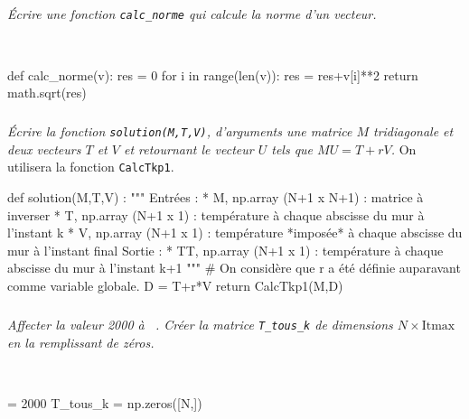 \documentclass[10pt,fleqn]{article} %
\begin{document}
\begin{multicols}{2}
\fi

\subparagraph{}
\textit{Écrire une fonction \texttt{calc\_norme} qui calcule la norme d'un vecteur. }
\ifprof
\begin{corrige}
 ~\\
\begin{python}
def calc_norme(v):
    res = 0
    for i in range(len(v)):
        res = res+v[i]**2
    return math.sqrt(res)        
\end{python}
\end{corrige}
\else
\fi

\subparagraph{\label{q_solve}}
\textit{Écrire la fonction \texttt{solution(M,T,V)}, d'arguments une matrice $M$
 tridiagonale et deux vecteurs $T$ et $V$ et retournant le vecteur $U$ tels que $MU=T+rV$.}
 On utilisera la fonction \texttt{CalcTkp1}.
\ifprof   
\begin{corrige}
\begin{python}
def solution(M,T,V) :
    """
    Entrées : 
        * M, np.array (N+1 x N+1) : matrice à inverser
        * T, np.array (N+1 x 1) : température à chaque abscisse du mur à l'instant k
        * V, np.array (N+1 x 1) : température *imposée* à chaque abscisse du mur à l'instant final
    Sortie : 
        * TT, np.array (N+1 x 1) : température à chaque abscisse du mur à l'instant k+1
    """
    # On considère que r a été définie auparavant comme variable globale.
    D = T+r*V
    return CalcTkp1(M,D)
\end{python}
\end{corrige}
\else
\fi

\subparagraph{}
\textit{Affecter la valeur 2000 à  \texttt{ }. Créer la matrice  \texttt{T\_tous\_k}  de dimensions $N\times \text{Itmax}$ en la remplissant de zéros.}
\ifprof
\begin{corrige}
~\\
\begin{python}
 = 2000
T_tous_k = np.zeros([N,])
\end{python}
\end{corrige}
\else
\fi



\end{multicols}
\end{document}
